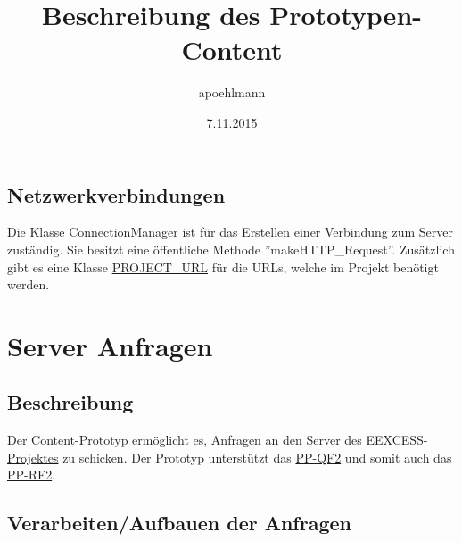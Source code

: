 
\title{Beschreibung des Prototypen-Content}
\author{apoehlmann}
\date{7.11.2015}


\section{Netzwerkverbindungen}

Die Klasse \href{https://github.com/SECH-Tag-EEXCESS-Browser/iOSX-App/blob/master/Team%20Content/Demos/JSON/Sech/Sech/ConnectionManager.swift}{ConnectionManager} ist für das Erstellen einer Verbindung zum Server zuständig. Sie besitzt eine öffentliche Methode ''makeHTTP\_Request''.
 Zusätzlich gibt es eine Klasse \href{https://github.com/SECH-Tag-EEXCESS-Browser/iOSX-App/blob/master/Team%20Content/Demos/JSON/Sech/Sech/ConnectionManager.swift}{PROJECT\_URL} für die URLs, welche im Projekt benötigt werden.

\chapter{Server Anfragen}

\section{Beschreibung}
Der Content-Prototyp ermöglicht es, Anfragen an den Server des  
\href{https://github.com/EEXCESS/eexcess/wiki}{EEXCESS-Projektes} zu schicken.
Der Prototyp unterstützt das \href{https://github.com/EEXCESS/eexcess/wiki/%5B21.09.2015%5D-Request-and-Response-format#pp-query-format}{PP-QF2}
und somit auch das \href{https://github.com/EEXCESS/eexcess/wiki/%5B21.09.2015%5D-Request-and-Response-format#pp-response-format}{PP-RF2}.

\section{Verarbeiten/Aufbauen der Anfragen}
